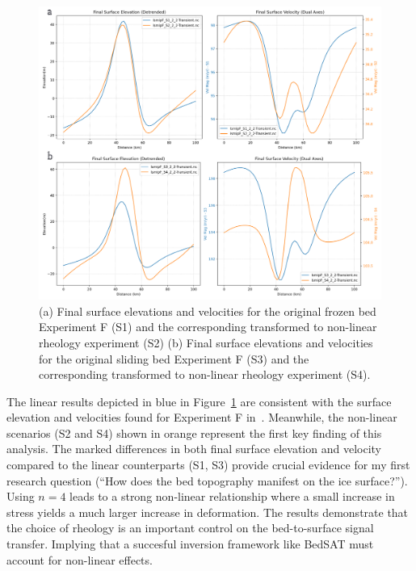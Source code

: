 \begin{figure}[H]
    \includegraphics[scale=0.40]{figures/combined_elevation_detrended_surface_velocity_['S1']_['S2']_['S3']_['S4'].png}
    \caption{(a) Final surface elevations and velocities for the original frozen bed Experiment F (S1) and the corresponding transformed to non-linear rheology experiment (S2) (b) Final surface elevations and velocities for the original sliding bed Experiment F (S3) and the corresponding transformed to non-linear rheology experiment (S4).}
    \label{fig:elev_vel_S1_S2_S3_S4}
\end{figure}

The linear results depicted in blue in Figure~\ref{fig:elev_vel_S1_S2_S3_S4} are consistent with the surface elevation and velocities found for Experiment F in~\cite{Pattyn_2008}. Meanwhile, the non-linear scenarios (S2 and S4) shown in orange  represent the first key finding of this analysis. The marked differences in both final surface elevation and velocity compared to the linear counterparts (S1, S3) provide crucial evidence for my first research question (``How does the bed topography manifest on the ice surface?''). Using $n = 4$ leads to a strong non-linear relationship where a small increase in stress yields a much larger increase in deformation. The results demonstrate that the choice of rheology is an important control on the bed-to-surface signal transfer. Implying that a succesful inversion framework like BedSAT must account for non-linear effects.

